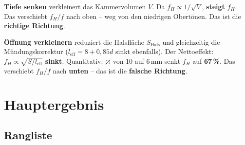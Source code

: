 \documentclass[11pt,a4paper]{article}
\begin{document}
\textbf{Tiefe senken} verkleinert das Kammervolumen $V$. Da $f_H \propto 1/\sqrt{V}$, \textbf{steigt} $f_H$. Das verschiebt $f_H/f$ nach oben -- weg von den niedrigen Obertönen. Das ist die \textbf{richtige Richtung}.

\textbf{Öffnung verkleinern} reduziert die Halsfläche $S_\text{Hals}$ und gleichzeitig die Mündungskorrektur ($l_\text{eff} = 8 + 0{,}85 d$ sinkt ebenfalls). Der Nettoeffekt: $f_H \propto \sqrt{S/l_\text{eff}}$ \textbf{sinkt}. Quantitativ: $\varnothing$ von 10 auf 6\,mm senkt $f_H$ auf \textbf{67\,\%}. Das verschiebt $f_H/f$ nach \textbf{unten} -- das ist die \textbf{falsche Richtung}.


\section{Hauptergebnis}

\begin{table}[H]
\centering\small
{}
\caption{Hauptvergleich. Fett: Variante C (bestes Ergebnis).}
\end{table}

\subsection{Rangliste}
\end{document}
